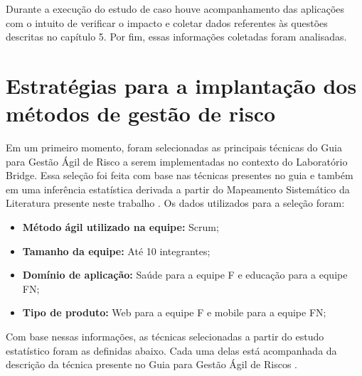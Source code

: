 \documentclass[
    12pt,       %
    openright,      %
    twoside,      %
    a4paper,      %
    english,      %
    french,       %
    spanish,      %
    brazil,       %
    ]{abntex2}
\begin{document}
Durante a execução do estudo de caso houve acompanhamento das aplicações com o intuito de verificar o impacto e coletar dados referentes às questões descritas no capítulo 5. Por fim, essas informações coletadas foram analisadas.

\section{Estratégias para a implantação dos métodos de gestão de risco}

Em um primeiro momento, foram selecionadas as principais técnicas do Guia para Gestão Ágil de Risco a serem implementadas no contexto do Laboratório Bridge. Essa seleção foi feita com base nas técnicas presentes no guia e também em uma inferência estatística derivada a partir do Mapeamento Sistemático da Literatura presente neste trabalho \cite{GARCIA:2022}. Os dados utilizados para a seleção foram:

\begin{itemize}
    \item \textbf{Método ágil utilizado na equipe:} Scrum;
    \item \textbf{Tamanho da equipe:} Até 10 integrantes;
    \item \textbf{Domínio de aplicação:} Saúde para a equipe F e educação para a equipe FN;
    \item \textbf{Tipo de produto:} Web para a equipe F e mobile para a equipe FN;
\end{itemize}

Com base nessas informações, as técnicas selecionadas a partir do estudo estatístico foram as definidas abaixo. Cada uma delas está acompanhada da descrição da técnica presente no Guia para Gestão Ágil de Riscos \cite{Vieira:2020}.
\end{document}
